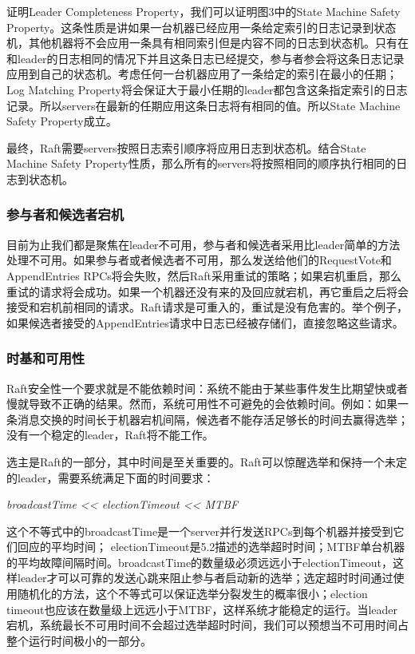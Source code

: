 \documentclass[journal]{IEEEtran}
\begin{document}
证明Leader Completeness Property，我们可以证明图3中的State Machine Safety Property。这条性质是讲如果一台机器已经应用一条给定索引的日志记录到状态机，其他机器将不会应用一条具有相同索引但是内容不同的日志到状态机。只有在和leader的日志相同的情况下并且这条日志已经提交，参与者参会将这条日志记录应用到自己的状态机。考虑任何一台机器应用了一条给定的索引在最小的任期；Log Matching Property将会保证大于最小任期的leader都包含这条指定索引的日志记录。所以servers在最新的任期应用这条日志将有相同的值。所以State Machine Safety Property成立。

最终，Raft需要servers按照日志索引顺序将应用日志到状态机。结合State Machine Safety Property性质，那么所有的servers将按照相同的顺序执行相同的日志到状态机。


\subsubsection{参与者和候选者宕机}
目前为止我们都是聚焦在leader不可用，参与者和候选者采用比leader简单的方法处理不可用。如果参与者或者候选者不可用，那么发送给他们的RequestVote和AppendEntries RPCs将会失败，然后Raft采用重试的策略；如果宕机重启，那么重试的请求将会成功。如果一个机器还没有来的及回应就宕机，再它重启之后将会接受和宕机前相同的请求。Raft请求是可重入的，重试是没有危害的。举个例子，如果候选者接受的AppendEntries请求中日志已经被存储们，直接忽略这些请求。

\subsubsection{时基和可用性}
Raft安全性一个要求就是不能依赖时间：系统不能由于某些事件发生比期望快或者慢就导致不正确的结果。然而，系统可用性不可避免的会依赖时间。例如：如果一条消息交换的时间长于机器宕机间隔，候选者不能存活足够长的时间去赢得选举；没有一个稳定的leader，Raft将不能工作。

选主是Raft的一部分，其中时间是至关重要的。Raft可以惊醒选举和保持一个未定的leader，需要系统满足下面的时间要求：
\begin{center}
\textit{broadcastTime <<  electionTimeout  << MTBF} 
\end{center}
这个不等式中的broadcastTime是一个server并行发送RPCs到每个机器并接受到它们回应的平均时间；
 electionTimeout是5.2描述的选举超时时间；MTBF单台机器的平均故障间隔时间。broadcastTime的数量级必须远远小于electionTimeout，这样leader才可以可靠的发送心跳来阻止参与者启动新的选举；选定超时时间通过使用随机化的方法，这个不等式可以保证选举分裂发生的概率很小；election timeout也应该在数量级上远远小于MTBF，这样系统才能稳定的运行。当leader 宕机，系统最长不可用时间不会超过选举超时时间，我们可以预想当不可用时间占整个运行时间极小的一部分。
 
\end{document}
